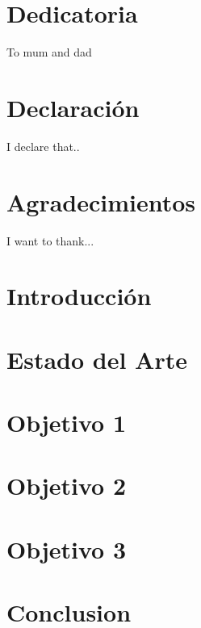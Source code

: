 \documentclass[15pt,twoside]{report}
\begin{document}




\chapter*{Dedicatoria}
To mum and dad

\chapter*{Declaración}
I declare that..

\chapter*{Agradecimientos}
I want to thank...


\tableofcontents

\listoffigures

\listoftables

\chapter{Introducción}


\chapter{Estado del Arte}


\chapter{Objetivo 1}


\chapter{Objetivo 2}


\chapter{Objetivo 3}


\chapter{Conclusion}




\medskip



\end{document}
